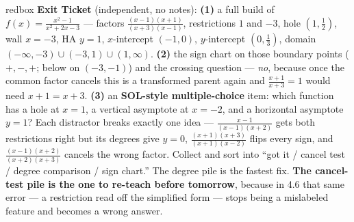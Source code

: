 \documentclass[10pt]{article}
\begin{document}
\begin{skillbox}{redbox}
\textbf{Exit Ticket} (independent, no notes): \textbf{(1)} a full build of
$f(x)=\frac{x^2-1}{x^2+2x-3}$ --- factors $\frac{(x-1)(x+1)}{(x+3)(x-1)}$, restrictions $1$ and $-3$,
hole $(1,\frac12)$, wall $x=-3$, HA $y=1$, $x$-intercept $(-1,0)$, $y$-intercept $(0,\frac13)$, domain
$(-\infty,-3)\cup(-3,1)\cup(1,\infty)$. \textbf{(2)} the sign chart on those boundary points
($+,-,+$; below on $(-3,-1)$) and the crossing question --- \emph{no}, because once the common factor
cancels this is a transformed parent again and $\frac{x+1}{x+3}=1$ would need $x+1=x+3$.
\textbf{(3)} an \textbf{SOL-style multiple-choice} item: which function has a hole at $x=1$, a
vertical asymptote at $x=-2$, and a horizontal asymptote $y=1$? Each distractor breaks exactly one
idea --- $\frac{x-1}{(x-1)(x+2)}$ gets both restrictions right but its degrees give $y=0$,
$\frac{(x+1)(x+3)}{(x+1)(x-2)}$ flips every sign, and $\frac{(x-1)(x+2)}{(x+2)(x+3)}$ cancels the
wrong factor. Collect and sort into ``got it / cancel test / degree comparison / sign chart.'' The
degree pile is the fastest fix. \textbf{The cancel-test pile is the one to re-teach before tomorrow},
because in 4.6 that same error --- a restriction read off the simplified form --- stops being a
mislabeled feature and becomes a wrong answer.
\end{skillbox}
\end{document}
